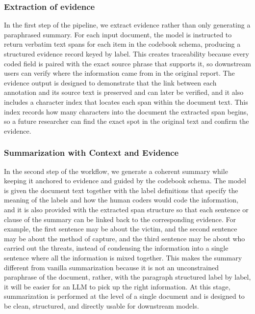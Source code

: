 \documentclass{article}
\begin{document}
\subsubsection{Extraction of evidence}\label{extraction-of-evidence}

In the first step of the pipeline, we extract evidence rather than only
generating a paraphrased summary. For each input document, the model is
instructed to return verbatim text spans for each item in the codebook
schema, producing a structured evidence record keyed by label. This
creates traceability because every coded field is paired with the exact
source phrase that supports it, so downstream users can verify where the
information came from in the original report. The evidence output is
designed to demonstrate that the link between each annotation and its
source text is preserved and can later be verified, and it also includes
a character index that locates each span within the document text. This
index records how many characters into the document the extracted span
begins, so a future researcher can find the exact spot in the original
text and confirm the evidence.

\subsubsection{Summarization with Context and
Evidence}\label{summarization-with-context-and-evidence}

In the second step of the workflow, we generate a coherent summary while
keeping it anchored to evidence and guided by the codebook schema. The
model is given the document text together with the label definitions
that specify the meaning of the labels and how the human coders would
code the information, and it is also provided with the extracted span
structure so that each sentence or clause of the summary can be linked
back to the corresponding evidence. For example, the first sentence may
be about the victim, and the second sentence may be about the method of
capture, and the third sentence may be about who carried out the
threats, instead of condensing the information into a single sentence
where all the information is mixed together. This makes the summary
different from vanilla summarization because it is not an unconstrained
paraphrase of the document, rather, with the paragraph structured label
by label, it will be easier for an LLM to pick up the right information.
At this stage, summarization is performed at the level of a single
document and is designed to be clean, structured, and directly usable
for downstream models.
\end{document}
